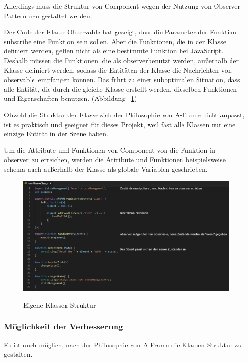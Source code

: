  Allerdings muss die Struktur von Component wegen der Nutzung von Observer Pattern neu gestaltet werden.
 
 Der Code der Klasse {\selectfont Observable} hat gezeigt, dass die Parameter der Funktion {\selectfont subscribe} eine Funktion sein sollen. Aber die Funktionen, die in der Klasse definiert werden, gelten nicht als eine bestimmte Funktion bei JavaScript. Deshalb müssen die Funktionen, die als \glqq observer\grqq benutzt werden, außerhalb der Klasse definiert werden, sodass die Entitäten der Klasse die Nachrichten von \glqq observable\grqq\ empfangen können. Das führt zu einer suboptimalen Situation, dass alle Entität, die durch die gleiche Klasse erstellt werden, dieselben Funktionen und Eigenschaften benutzen. (Abbildung ~\ref{fig:eigenesClass})
 
 Obwohl die Struktur der Klasse sich der Philosophie von A-Frame nicht anpasst, ist es praktisch und geeignet für dieses Projekt, weil fast alle Klassen nur eine einzige Entität in der Szene haben.
 
 Um die Attribute und Funktionen von Component von die Funktion in \glqq observer\grqq\ zu erreichen, werden die Attribute und Funktionen beispielsweise {\selectfont schema} auch außerhalb der Klasse als globale Variablen geschrieben.
 
\begin{figure}[ht]
\vspace*{1em}
\centering
\caption[Eigene Klassen Struktur]{Eigene Klassen Struktur}
\includegraphics[width=\textwidth]{images/eigenesClass.png}
\label{fig:eigenesClass} 
\end{figure}
 
 \subsubsection{Möglichkeit der Verbesserung}
 Es ist auch möglich, nach der Philosophie von A-Frame die Klassen Struktur zu gestalten.
 
